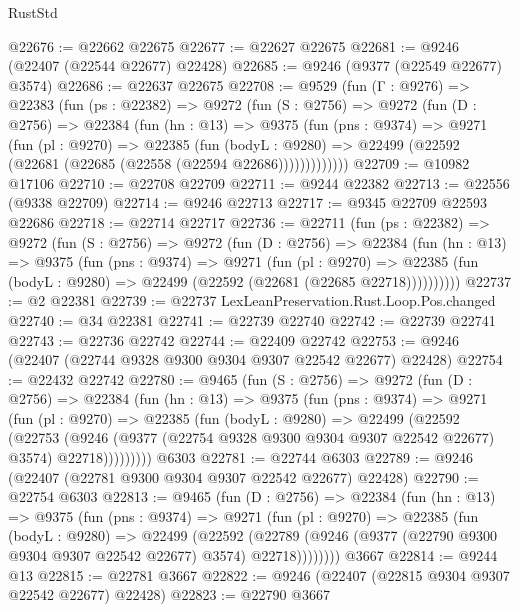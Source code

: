 \begin{lexlean}{RustStd}
\begin{coremodule}
@22676 := @22662 @22675
@22677 := @22627 @22675
@22681 := @9246 (@22407 (@22544 @22677) @22428)
@22685 := @9246 (@9377 (@22549 @22677) @3574)
@22686 := @22637 @22675
@22708 := @9529
    (fun (Γ : @9276) =>
    @22383
      (fun (ps : @22382) =>
      @9272
        (fun (S : @2756) =>
        @9272
          (fun (D : @2756) =>
          @22384
            (fun (hn : @13) =>
            @9375
              (fun (pns : @9374) =>
              @9271
                (fun (pl : @9270) =>
                @22385
                  (fun (bodyL : @9280) =>
                  @22499 (@22592 (@22681 (@22685 (@22558 (@22594 @22686)))))))))))))
@22709 := @10982 @17106
@22710 := @22708 @22709
@22711 := @9244 @22382
@22713 := @22556 (@9338 @22709)
@22714 := @9246 @22713
@22717 := @9345 @22709 @22593 @22686
@22718 := @22714 @22717
@22736 := @22711
    (fun (ps : @22382) =>
    @9272
      (fun (S : @2756) =>
      @9272
        (fun (D : @2756) =>
        @22384
          (fun (hn : @13) =>
          @9375
            (fun (pns : @9374) =>
            @9271
              (fun (pl : @9270) =>
              @22385 (fun (bodyL : @9280) => @22499 (@22592 (@22681 (@22685 @22718))))))))))
@22737 := @2 @22381
@22739 := @22737 LexLeanPreservation.Rust.Loop.Pos.changed
@22740 := @34 @22381
@22741 := @22739 @22740
@22742 := @22739 @22741
@22743 := @22736 @22742
@22744 := @22409 @22742
@22753 := @9246 (@22407 (@22744 @9328 @9300 @9304 @9307 @22542 @22677) @22428)
@22754 := @22432 @22742
@22780 := @9465
    (fun (S : @2756) =>
    @9272
      (fun (D : @2756) =>
      @22384
        (fun (hn : @13) =>
        @9375
          (fun (pns : @9374) =>
          @9271
            (fun (pl : @9270) =>
            @22385
              (fun (bodyL : @9280) =>
              @22499
                (@22592
                  (@22753
                    (@9246
                      (@9377 (@22754 @9328 @9300 @9304 @9307 @22542 @22677) @3574)
                      @22718)))))))))
    @6303
@22781 := @22744 @6303
@22789 := @9246 (@22407 (@22781 @9300 @9304 @9307 @22542 @22677) @22428)
@22790 := @22754 @6303
@22813 := @9465
    (fun (D : @2756) =>
    @22384
      (fun (hn : @13) =>
      @9375
        (fun (pns : @9374) =>
        @9271
          (fun (pl : @9270) =>
          @22385
            (fun (bodyL : @9280) =>
            @22499
              (@22592
                (@22789 (@9246 (@9377 (@22790 @9300 @9304 @9307 @22542 @22677) @3574) @22718))))))))
    @3667
@22814 := @9244 @13
@22815 := @22781 @3667
@22822 := @9246 (@22407 (@22815 @9304 @9307 @22542 @22677) @22428)
@22823 := @22790 @3667

\end{coremodule}
\end{lexlean}
